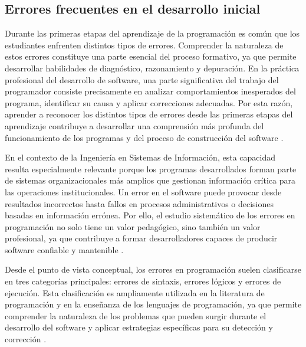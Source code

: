 \documentclass[12pt,twoside]{book}
\begin{document}
				\subsection{Errores frecuentes en el desarrollo inicial}
					\noindent
					Durante las primeras etapas del aprendizaje de la programación es común que los estudiantes enfrenten distintos tipos de errores. Comprender la naturaleza de estos errores constituye una parte esencial del proceso formativo, ya que permite desarrollar habilidades de diagnóstico, razonamiento y depuración. En la práctica profesional del desarrollo de software, una parte significativa del trabajo del programador consiste precisamente en analizar comportamientos inesperados del programa, identificar su causa y aplicar correcciones adecuadas. Por esta razón, aprender a reconocer los distintos tipos de errores desde las primeras etapas del aprendizaje contribuye a desarrollar una comprensión más profunda del funcionamiento de los programas y del proceso de construcción del software \cite{Pressman2019Software,Sommerville2015Software,Gaddis2022Starting}.
					
					En el contexto de la Ingeniería en Sistemas de Información, esta capacidad resulta especialmente relevante porque los programas desarrollados forman parte de sistemas organizacionales más amplios que gestionan información crítica para las operaciones institucionales. Un error en el software puede provocar desde resultados incorrectos hasta fallos en procesos administrativos o decisiones basadas en información errónea. Por ello, el estudio sistemático de los errores en programación no solo tiene un valor pedagógico, sino también un valor profesional, ya que contribuye a formar desarrolladores capaces de producir software confiable y mantenible \cite{Laudon2020Management,Pressman2019Software,SWEBOK2025Guide}.
					
					Desde el punto de vista conceptual, los errores en programación suelen clasificarse en tres categorías principales: errores de sintaxis, errores lógicos y errores de ejecución. Esta clasificación es ampliamente utilizada en la literatura de programación y en la enseñanza de los lenguajes de programación, ya que permite comprender la naturaleza de los problemas que pueden surgir durante el desarrollo del software y aplicar estrategias específicas para su detección y corrección \cite{Gaddis2022Starting,Farrell2018Programming,Deitel2025Java}.
					
\end{document}
